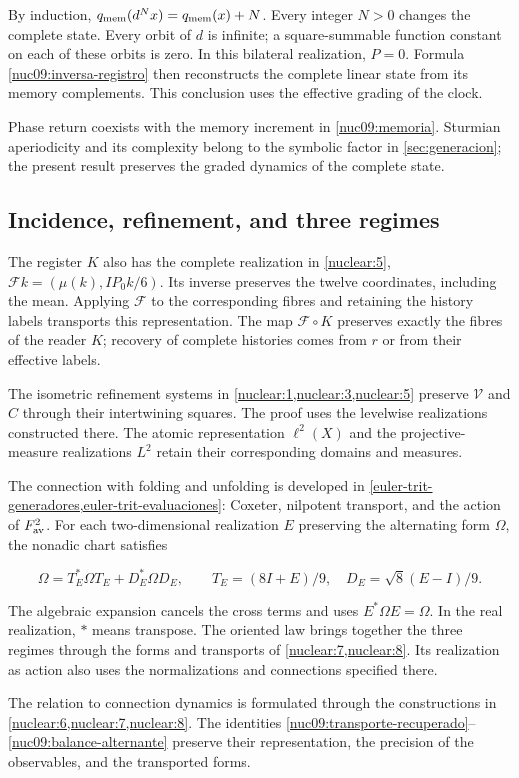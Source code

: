 By induction, \(q_{\rm mem}(d^Nx)=q_{\rm mem}(x)+N\). Every integer \(N>0\) changes the complete state. Every orbit of \(d\) is infinite; a square-summable function constant on each of these orbits is zero. In this bilateral realization, \(P=0\). Formula \eqref{nuc09:inversa-registro} then reconstructs the complete linear state from its memory complements. This conclusion uses the effective grading of the clock.

Phase return coexists with the memory increment in \eqref{nuc09:memoria}. Sturmian aperiodicity and its complexity belong to the symbolic factor in \cref{sec:generacion}; the present result preserves the graded dynamics of the complete state.

\subsection{Incidence, refinement, and three regimes}

The register \(K\) also has the complete realization in \cref{nuclear:5}, \(\mathcal Fk=(\mu(k),IP_0k/6)\). Its inverse preserves the twelve coordinates, including the mean. Applying \(\mathcal F\) to the corresponding fibres and retaining the history labels transports this representation. The map \(\mathcal F\circ K\) preserves exactly the fibres of the reader \(K\); recovery of complete histories comes from \(r\) or from their effective labels.

The isometric refinement systems in \cref{nuclear:1,nuclear:3,nuclear:5} preserve \(\mathcal V\) and \(C\) through their intertwining squares. The proof uses the levelwise realizations constructed there. The atomic representation \(\ell^2(X)\) and the projective-measure realizations \(L^2\) retain their corresponding domains and measures.

The connection with folding and unfolding is developed in \cref{euler-trit-generadores,euler-trit-evaluaciones}: Coxeter, nilpotent transport, and the action of \(F_{\rm av}^2\). For each two-dimensional realization \(E\) preserving the alternating form \(\Omega\), the nonadic chart satisfies

\begin{equation}
\Omega=T_E^*\Omega T_E+D_E^*\Omega D_E,
\qquad T_E=(8I+E)/9,\quad D_E=\sqrt8(E-I)/9.
\label{nuc09:balance-alternante}
\end{equation}

The algebraic expansion cancels the cross terms and uses \(E^*\Omega E=\Omega\). In the real realization, \(*\) means transpose. The oriented law brings together the three regimes through the forms and transports of \cref{nuclear:7,nuclear:8}. Its realization as action also uses the normalizations and connections specified there.

The relation to connection dynamics is formulated through the constructions in \cref{nuclear:6,nuclear:7,nuclear:8}. The identities \eqref{nuc09:transporte-recuperado}--\eqref{nuc09:balance-alternante} preserve their representation, the precision of the observables, and the transported forms.

